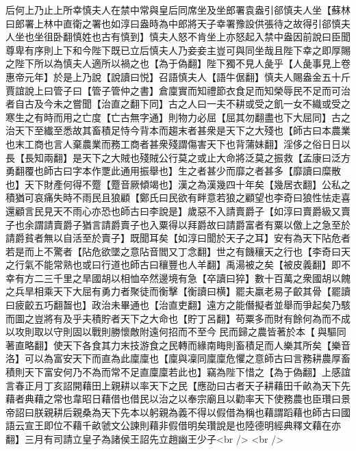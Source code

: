 后何上乃止上所幸慎夫人在禁中常與皇后同席坐及坐郎署袁盎引郤慎夫人坐【蘇林曰郎署上林中直衛之署也如淳曰盎時為中郎將天子幸署豫設供張待之故得引郤慎夫人坐也坐徂卧翻慎姓也古有慎到】慎夫人怒不肯坐上亦怒起入禁中盎因前說曰臣聞尊卑有序則上下和今陛下既已立后慎夫人乃妾妾主豈可與同坐哉且陛下幸之即厚賜之陛下所以為慎夫人適所以禍之也【為于偽翻】陛下獨不見人彘乎【人彘事見上卷惠帝元年】於是上乃說【說讀曰悦】召語慎夫人【語牛倨翻】慎夫人賜盎金五十斤　賈誼說上曰管子曰【管子管仲之書】倉廩實而知禮節衣食足而知榮辱民不足而可治者自古及今未之嘗聞【治直之翻下同】古之人曰一夫不耕或受之飢一女不織或受之寒生之有時而用之亡度【亡古無字通】則物力必屈【屈其勿翻盡也下大屈同】古之治天下至纎至悉故其畜積足恃今背本而趨末者甚衆是天下之大殘也【師古曰本農業也末工商也言人棄農業而務工商者甚衆殘謂傷害天下也背蒲妹翻】淫侈之俗日日以長【長知兩翻】是天下之大賊也殘賊公行莫之或止大命將泛莫之振救【孟康曰泛方勇翻覆也師古曰字本作覂此通用振舉也】生之者甚少而靡之者甚多【靡讀曰糜散也】天下財產何得不蹷【蹷音厥傾竭也】漢之為漢幾四十年矣【幾居衣翻】公私之積猶可哀痛失時不雨民且狼顧【鄭氏曰民欲有畔意若狼之顧望也李奇曰狼性怯走喜還顧言民見天不雨心亦恐也師古曰李說是】歲惡不入請賣爵子【如淳曰賣爵級又賣子也余謂請賣爵子猶言請爵賣子也入粟得以拜爵故曰請爵富者有粟以儌上之急至於請爵貧者無以自活至於賣子】既聞耳矣【如淳曰聞於天子之耳】安有為天下阽危者若是而上不驚者【阽危欲墜之意阽音閻又丁念翻】世之有饑穰天之行也【李奇曰天之行氣不能常熟也或曰行道也師古曰穰豐也人羊翻】禹湯被之矣【被皮義翻】即不幸有方二三千里之旱國胡以相恤卒然邊境有急【卒讀曰猝】數十百萬之衆國胡以餽之兵旱相乘天下大屈有勇力者聚徒而衡擊【衡讀曰横】罷夫羸老易子齩其骨【罷讀曰疲齩五巧翻齧也】政治未畢通也【治直吏翻】遠方之能僭擬者並舉而爭起矣乃駭而圖之豈將有及乎夫積貯者天下之大命也【貯丁呂翻】苟粟多而財有餘何為而不成以攻則取以守則固以戰則勝懷敵附遠何招而不至今民而歸之農皆著於本【與驅同著直略翻】使天下各食其力末技游食之民轉而緣南畮則畜積足而人樂其所矣【樂音洛】可以為富安天下而直為此廩廩也【廩與凜同廩廩危懼之意師古曰言務耕農厚畜積則天下富安何乃不為而常不足直廩廩若此也】竊為陛下惜之【為于偽翻】上感誼言春正月丁亥詔開藉田上親耕以率天下之民【應劭曰古者天子耕藉田千畝為天下先藉者典藉之常也韋昭日藉借也借民以治之以奉宗廟且以勸率天下使務農也臣瓚曰景帝詔曰朕親耕后親桑為天下先本以躬親為義不得以假借為稱也藉謂蹈藉也師古曰國語云宣王即位不藉千畝虢文公諫則藉非假借明矣瓚說是也陸德明經典釋文藉在亦翻】三月有司請立皇子為諸侯王詔先立趙幽王少子<br />
<br />
